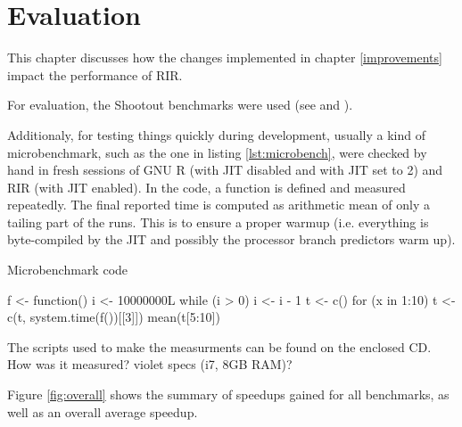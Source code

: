 \chapter{Evaluation\label{evaluation}}

This chapter discusses how the changes implemented in chapter \ref{improvements} impact the performance of RIR.

For evaluation, the Shootout benchmarks were used (see \autocite{shootout} and \autocite{fastr}). 

Additionaly, for testing things quickly during development, usually a kind of microbenchmark, such as the one in listing \ref{lst:microbench}, were checked by hand in fresh sessions of GNU R (with JIT disabled and with JIT set to 2) and RIR (with JIT enabled). In the code, a function is defined and measured repeatedly. The final reported time is computed as arithmetic mean of only a tailing part of the runs. This is to ensure a proper warmup (i.e. everything is byte-compiled by the JIT and possibly the processor branch predictors warm up).

\begin{listing}[htbp]
  \caption{\label{lst:microbench}Microbenchmark code}
  \begin{rcode}
f <- function() {
    i <- 10000000L
    while (i > 0) i <- i - 1
}
t <- c()
for (x in 1:10) t <- c(t, system.time(f())[[3]])
mean(t[5:10])
  \end{rcode}
\end{listing}

The scripts used to make the measurments can be found on the enclosed CD. \todo How was it measured? violet specs (i7, 8GB RAM)?

Figure \ref{fig:overall} shows the summary of speedups gained for all benchmarks, as well as an overall average speedup.


